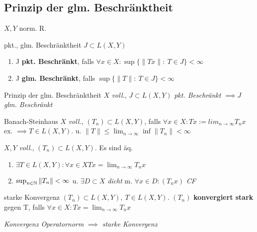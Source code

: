 \subsection{Prinzip der glm. Beschränktheit}
$X,Y$ norm. R.

\begin{definition}{pkt., glm. Beschränktheit}
  $J \subset L(X,Y)$
  \begin{enumerate}[label = (\roman*)]
    \item J \textbf{pkt. Beschränkt},
      falls $\forall x\in X:\sup \{\|Tx\|:\ T \in J\} < \infty$
    \item J \textbf{glm. Beschränkt},
      falls $\sup \{\|T\|:\ T \in J\} < \infty$
  \end{enumerate}
\end{definition}

\begin{satz}{Prinzip der glm. Beschränktheit}
  $X$ \textit{voll.}, $J \subset L(X,Y)$ \textit{pkt. Beschränkt} $\implies J$
  \textit{glm. Beschränkt}
\end{satz}

\begin{satz}{Banach-Steinhaus}
  $X$ \textit{voll.}, $(T_n) \subset L(X,Y)$,
  falls $\forall x\in X: Tx:= lim_{n\to \infty} T_nx$ ex.
  $\implies T \in L(X,Y)$. u.
  $\|T\| \leq \lim_{n\to \infty} \inf \|T_n\| < \infty$
\end{satz}

\begin{korrolar}
  $X,Y$ \textit{voll.}, $(T_n) \subset L(X,Y)$. Es sind äq.
  \begin{enumerate}[label = (\roman*)]
    \item $\exists T \in L(X,Y): \forall x\in X Tx = \lim_{n\to\infty}T_nx$
    \item $\sup_{n \in \mathbb{N}} \|T_n\| <\infty $ u. $\exists D\subset X$
      \textit{dicht} m. $\forall x\in D: (T_nx)$ \textit{CF}
  \end{enumerate}
\end{korrolar}

\begin{definition}{starke Konvergenz}
  $(T_n)\subset L(X,Y),\ T\in L(X,Y)$. $(T_n)$ \textbf{konvergiert stark}
  gegen T, falls $\forall x\in X: Tx = \lim_{n\to\infty}T_nx$
\end{definition}

\begin{bemerkung}
  \textit{Konvergenz Operatornorm} $\implies$ \textit{starke Konvergenz}
\end{bemerkung}


